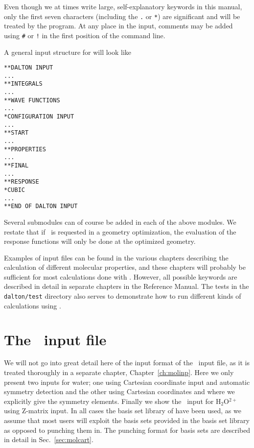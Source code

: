 Even though we at times write large, self-explanatory keywords in this
manual, only the first seven characters (including the \verb|.| or
\verb|*|) are significant and will be
treated by the program. At any
place in the input, comments may be added using
\verb|#| or \verb|!|
in the first position of the command line.

A general input structure for {\dalton} will look like

\begin{verbatim}
**DALTON INPUT
...
**INTEGRALS
...
**WAVE FUNCTIONS
...
*CONFIGURATION INPUT
...
**START
...
**PROPERTIES
...
**FINAL
...
**RESPONSE
*CUBIC
...
**END OF DALTON INPUT
\end{verbatim}

Several submodules can of course be added in each of the above
modules. We restate that if \resp\ is requested in a geometry
optimization, the evaluation of the response functions will only be
done at the optimized geometry.

Examples of input files can be found in the various chapters
describing the calculation of different molecular properties, and
these chapters will probably be sufficient for most calculations done
with {\dalton}. However, all possible keywords are described in detail
in separate chapters in the Reference Manual. The tests in the
\verb|dalton/test| directory also serves to demonstrate how to run
different kinds of calculations using {\dalton}.

\section{The \mol\ input file}

We will not go into great detail here of the input format of the \mol\ input
file, as it is treated thoroughly in a separate chapter,
Chapter~\ref{ch:molinp}. Here we only present two inputs for
water; one
using Cartesian coordinate input and
automatic symmetry detection and
the other using Cartesian coordinates and where we explicitly give the
symmetry elements. Finally we show the \mol\ input for H$_{2}$O$^{2+}$
using Z-matrix input. In
all cases the basis set library of {\dalton} have been used, as we
assume that most users will exploit the basis sets provided in the basis
set library as opposed to punching them in. The punching
format for basis sets are described in detail in Sec.~\ref{sec:molcart}.

